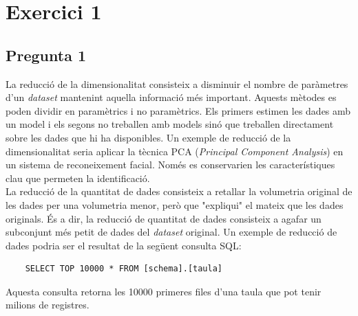 \documentclass[a4paper,12pt]{report}
\begin{document}
\thispagestyle{empty}
	\begin{titlepage}
		\maketitle
		\thispagestyle{empty}
	\end{titlepage}
	\cleardoublepage
	\newpage

\thispagestyle{empty}
\tableofcontents
\thispagestyle{empty}
\listoffigures
\thispagestyle{empty}
\newpage
{}
\section*{Exercici 1}

\subsection*{Pregunta 1}
La reducció de la dimensionalitat consisteix a disminuir el nombre de paràmetres d'un \textit{dataset} mantenint aquella informació més important. Aquests mètodes es poden dividir en paramètrics i no paramètrics. Els primers estimen les dades amb un model i els segons no treballen amb models sinó que treballen directament sobre les dades que hi ha disponibles. Un exemple de reducció de la dimensionalitat seria aplicar la tècnica PCA (\textit{Principal Component Analysis}) en un sistema de reconeixement facial. Només es conservarien les característiques clau que permeten la identificació.\\
La reducció de la quantitat de dades consisteix a retallar la volumetria original de les dades per una volumetria menor, però que "expliqui" el mateix que les dades originals. És a dir, la reducció de quantitat de dades consisteix a agafar un subconjunt més petit de dades del \textit{dataset} original. Un exemple de reducció de dades podria ser el resultat de la següent consulta SQL:
\begin{lstlisting}
    SELECT TOP 10000 * FROM [schema].[taula]
\end{lstlisting}
Aquesta consulta retorna les 10000 primeres files d'una taula que pot tenir milions de registres.
\end{document}
